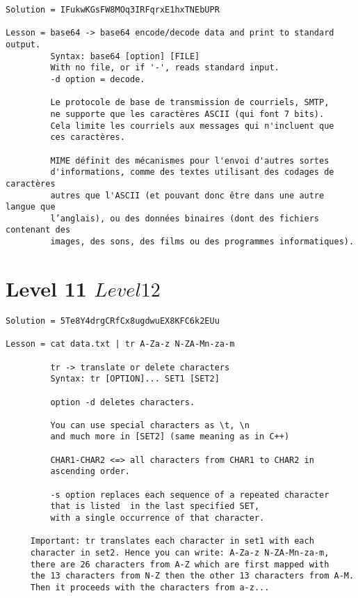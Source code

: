 \documentclass[a4paper]{report}
\begin{document}
\begin{verbatim}
Solution = IFukwKGsFW8MOq3IRFqrxE1hxTNEbUPR

Lesson = base64 -> base64 encode/decode data and print to standard output. 
		 Syntax: base64 [option] [FILE]
	 	 With no file, or if '-', reads standard input. 
	 	 -d option = decode. 
	 	 
	 	 Le protocole de base de transmission de courriels, SMTP, 
	 	 ne supporte que les caractères ASCII (qui font 7 bits). 
	 	 Cela limite les courriels aux messages qui n'incluent que 
	 	 ces caractères. 
	 	 
	 	 MIME définit des mécanismes pour l'envoi d'autres sortes 
	 	 d'informations, comme des textes utilisant des codages de caractères 
	 	 autres que l'ASCII (et pouvant donc être dans une autre langue que 	   
	 	 l’anglais), ou des données binaires (dont des fichiers contenant des
	 	 images, des sons, des films ou des programmes informatiques).
\end{verbatim}

\newpage
\section{Level 11 \rightarrow $ Level 12 $}

\begin{verbatim}
Solution = 5Te8Y4drgCRfCx8ugdwuEX8KFC6k2EUu

Lesson = cat data.txt | tr A-Za-z N-ZA-Mn-za-m

		 tr -> translate or delete characters 
		 Syntax: tr [OPTION]... SET1 [SET2]
		 
		 option -d deletes characters.
		 
		 You can use special characters as \t, \n 
		 and much more in [SET2] (same meaning as in C++)
		 
		 CHAR1-CHAR2 <=> all characters from CHAR1 to CHAR2 in 
		 ascending order. 
		 
		 -s option replaces each sequence of a repeated character 
		 that is listed  in the last specified SET, 
		 with a single occurrence of that character.

	 Important: tr translates each character in set1 with each 
	 character in set2. Hence you can write: A-Za-z N-ZA-Mn-za-m,
	 there are 26 characters from A-Z which are first mapped with 
	 the 13 characters from N-Z then the other 13 characters from A-M.
	 Then it proceeds with the characters from a-z...
\end{verbatim}
\end{document}
